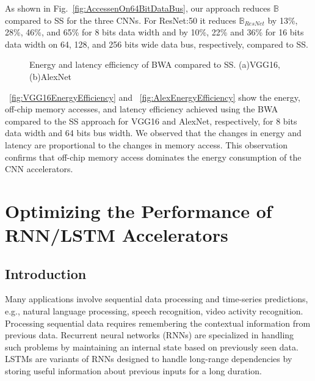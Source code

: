 \documentclass[a4paper,10pt]{article}
\newcommand{\numBytesOffChip}{\mathbb{B}}
\begin{document}
As shown in Fig.~\ref{fig:AccessenOn64BitDataBus}, our approach reduces $\numBytesOffChip$ compared to SS for the three CNNs. For ResNet:50 it reduces $\numBytesOffChip_{ResNet}$ by 13\%, 28\%, 46\%, and 65\% for 8 bits data width and by 10\%, 22\% and 36\% for 16 bits data width on 64, 128, and 256 bits wide data bus, respectively, compared to SS.
\begin{figure}[!htb]
	\centering
	\hfil
	\hfil
	\caption{Energy and latency efficiency of BWA compared to SS. (a)VGG16, (b)AlexNet}
	\label{fig:EffectOnLatency}
\end{figure}

\figurename{~\ref{fig:VGG16EnergyEfficiency}} and \figurename{~\ref{fig:AlexEnergyEfficiency}} show the energy, off-chip memory accesses, and latency efficiency achieved using the BWA compared to the SS approach for VGG16 and AlexNet, respectively, for 8 bits data width and 64 bits bus width. We observed that the changes in energy and latency are proportional to the changes in memory access. This observation confirms that off-chip memory access dominates the energy consumption of the CNN accelerators.
\section{Optimizing the Performance of RNN/LSTM Accelerators}
\subsection{Introduction}
Many applications involve sequential data processing and time-series predictions, e.g., natural language processing, speech recognition, video activity recognition. Processing sequential data requires remembering the contextual information from previous data. Recurrent neural networks (RNNs) are specialized in handling such problems by maintaining an internal state based on previously seen data. LSTMs \cite{hochreiter1997long} are variants of RNNs designed to handle long-range dependencies by storing useful information about previous inputs for a long duration. 
\end{document}
